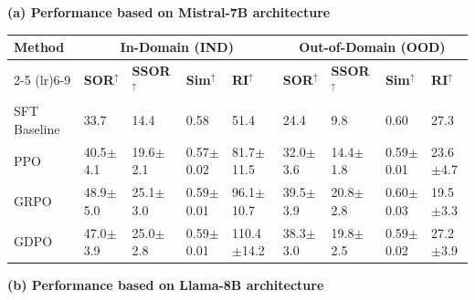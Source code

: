 \documentclass[11pt]{article}
\begin{document}
\begin{table}[h]
\centering
\small
\setlength{\tabcolsep}{5pt}
\renewcommand{\arraystretch}{1.2}

\textbf{(a) Performance based on Mistral-7B architecture}

\vspace{4pt}

\begin{tabular}{@{} l llll llll @{}}
\toprule
\multirow{2}{*}{\textbf{Method}} & \multicolumn{4}{c}{In-Domain (IND)} & \multicolumn{4}{c}{Out-of-Domain (OOD)} \\
\cmidrule(lr){2-5} \cmidrule(lr){6-9}
& \textbf{SOR}$^{\uparrow}$ & \textbf{SSOR}$^{\uparrow}$ & \textbf{Sim}$^{\uparrow}$ & \textbf{RI}$^{\uparrow}$ & \textbf{SOR}$^{\uparrow}$ & \textbf{SSOR}$^{\uparrow}$ & \textbf{Sim}$^{\uparrow}$ & \textbf{RI}$^{\uparrow}$ \\
\midrule
SFT Baseline & 33.7 & 14.4 & 0.58 & 51.4 & 24.4 & 9.8 & 0.60 & 27.3 \\
PPO & 40.5{\scriptsize$\pm$4.1} & 19.6{\scriptsize$\pm$2.1} & 0.57{\scriptsize$\pm$0.02} & 81.7{\scriptsize$\pm$11.5} 
    & 32.0{\scriptsize$\pm$3.6} & 14.4{\scriptsize$\pm$1.8} & 0.59{\scriptsize$\pm$0.01} & 23.6{\scriptsize$\pm$4.7} \\
GRPO & 48.9{\scriptsize$\pm$5.0} & 25.1{\scriptsize$\pm$3.0} & 0.59{\scriptsize$\pm$0.01} & 96.1{\scriptsize$\pm$10.7} 
     & 39.5{\scriptsize$\pm$3.9} & 20.8{\scriptsize$\pm$2.8} & 0.60{\scriptsize$\pm$0.03} & 19.5{\scriptsize$\pm$3.3} \\
GDPO & 47.0{\scriptsize$\pm$3.9} & 25.0{\scriptsize$\pm$2.8} & 0.59{\scriptsize$\pm$0.01} & 110.4{\scriptsize$\pm$14.2} 
     & 38.3{\scriptsize$\pm$3.0} & 19.8{\scriptsize$\pm$2.5} & 0.59{\scriptsize$\pm$0.02} & 27.2{\scriptsize$\pm$3.9} \\
\bottomrule
\end{tabular}

\vspace{12pt}

\textbf{(b) Performance based on Llama-8B architecture}

\vspace{4pt}


\end{table}
\end{document}
